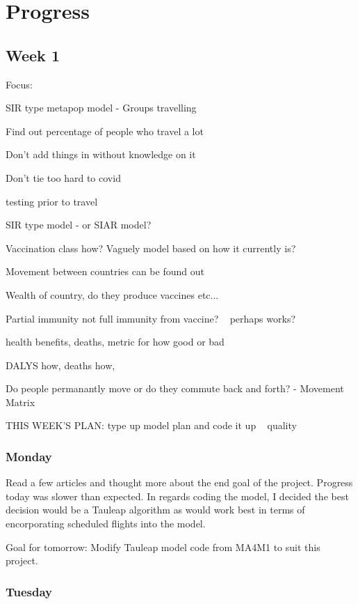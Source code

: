 \documentclass[a4paper,11pt]{article}
\theoremstyle{plain}
\theoremstyle{definition}
\begin{document}
\break

\section{Progress}

\subsection{Week 1}

Focus:

SIR type metapop model - Groups travelling

Find out percentage of people who travel a lot

Don't add things in without knowledge on it

Don't tie too hard to covid

testing prior to travel

SIR type model - or SIAR model?

Vaccination class how? Vaguely model based on how it currently is?

Movement between countries can be found out

Wealth of country, do they produce vaccines etc...

Partial immunity not full immunity from vaccine? ~ perhaps works?

health benefits, deaths, metric for how good or bad

DALYS how, deaths how, 

Do people permanantly move or do they commute back and forth? - Movement Matrix

THIS WEEK'S PLAN:
type up model plan and code it up ~ quality


\subsubsection{Monday}

Read a few articles and thought more about the end goal of the project. Progress today was slower than expected. In regards coding the model, I decided the best decision would be a Tauleap algorithm as would work best in terms of encorporating scheduled flights into the model.

Goal for tomorrow: Modify Tauleap model code from MA4M1 to suit this project.

\subsubsection{Tuesday}
\end{document}

